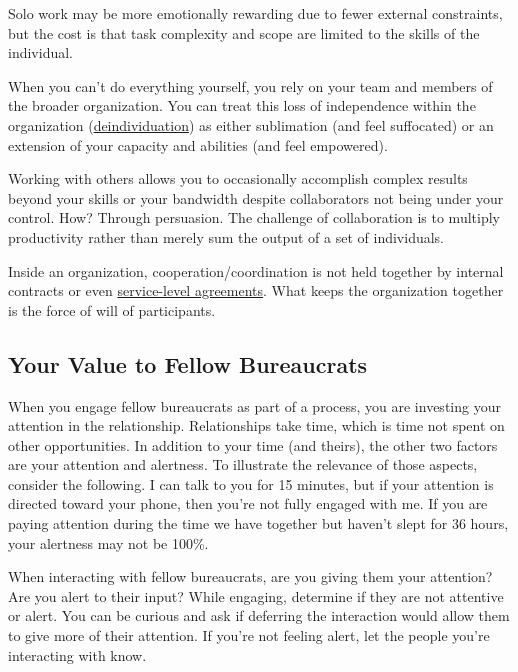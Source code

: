 Solo work may be more emotionally rewarding due to fewer external constraints, but the cost is that task complexity and scope are limited to the skills of the individual. 


When you can't do everything yourself, you rely on your team and members of the broader organization. You can treat this loss of independence within the organization (\href{https://en.wikipedia.org/wiki/Deindividuation}{deindividuation}) 
as either sublimation (and feel suffocated) or an extension of your capacity and abilities (and feel empowered).

Working with others allows you to occasionally accomplish complex results beyond your skills or your bandwidth despite  collaborators not being under your control. How? Through persuasion. 
The challenge of collaboration is to multiply productivity rather than merely sum the output of a set of individuals. 

Inside an organization, cooperation/coordination is not held together by internal contracts or even \href{https://en.wikipedia.org/wiki/Service-level_agreement}{service-level agreements}. 
What keeps the organization together is the force of will of participants. 


\subsection*{Your Value to Fellow Bureaucrats}

When you engage fellow bureaucrats as part of a process, you are investing your attention in the relationship. Relationships take time, which is time not spent on other opportunities. In addition to your time (and theirs), the other two factors are your attention and alertness. To illustrate the relevance of those aspects, consider the following. I can talk to you for 15 minutes, but if your attention is directed toward your phone, then you're not fully engaged with me. If you are paying attention during the time we have together but haven't slept for 36 hours, your alertness may not be 100\%. 

When interacting with fellow bureaucrats, are you giving them your attention? Are you alert to their input? While engaging, determine if they are not attentive or alert. You can be curious and ask if deferring the interaction would allow them to give more of their attention. If you're not feeling alert, let the people you're interacting with know.


